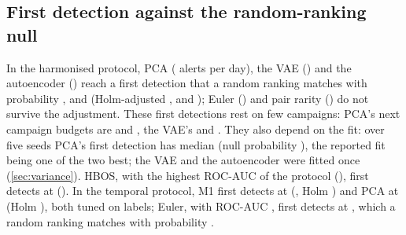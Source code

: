 \documentclass[11pt,a4paper]{article}
\begin{document}
\subsection{First detection against the random-ranking null}
In the harmonised protocol, PCA (\HarmPcaFirstDetection{} alerts per day), the VAE (\HarmVaeFirstDetection{}) and the autoencoder (\HarmAutoencoderFirstDetection{}) reach a first detection that a random ranking matches with probability \HarmPcaNullP{}, \HarmVaeNullP{} and \HarmAutoencoderNullP{} (Holm-adjusted \HarmPcaNullHolm{}, \HarmVaeNullHolm{} and \HarmAutoencoderNullHolm{}); Euler (\HarmEulerFirstDetection{}) and pair rarity (\HarmPairRarityFirstDetection{}) do not survive the adjustment. These first detections rest on few campaigns: PCA's next campaign budgets are \HarmPcaSecondBudget{} and \HarmPcaThirdBudget{}, the VAE's \HarmVaeSecondBudget{} and \HarmVaeThirdBudget{}. They also depend on the fit: over five seeds PCA's first detection has median \HarmPcaFitFirstMedian{} (null probability \HarmPcaFitNullMedian{}), the reported fit being one of the two best; the VAE and the autoencoder were fitted once (\cref{sec:variance}). HBOS, with the highest ROC-AUC of the protocol (\HarmHbosRocAuc{}), first detects at \HarmHbosFirstDetection{} (\HarmHbosNullP{}). In the temporal protocol, M1 first detects at \TempRulesFirstDetection{} (\TempRulesNullP{}, Holm \TempRulesNullHolm{}) and PCA at \TempPcaFirstDetection{} (Holm \TempPcaNullHolm{}), both tuned on labels; Euler, with ROC-AUC \TempEulerRocAuc{}, first detects at \TempEulerFirstDetection{}, which a random ranking matches with probability \TempEulerNullP{}.
\end{document}
